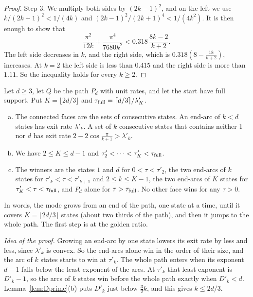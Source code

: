 \begin{proof}
Step 3. We multiply both sides by $(2k-1)^2$, and on the left we use
$k/(2k+1)^2<1/(4k)$ and $(2k-1)^2/(2k+1)^4<1/(4k^2)$. It is then enough to show
that
\[
 \frac{\pi^2}{12k}+\frac{\pi^4}{7680k^2}<0.318\,\frac{8k-2}{k+2}.
\]
The left side decreases in $k$, and the right side, which is
$0.318(8-\frac{18}{k+2})$, increases. At $k=2$ the left side is less than
$0.415$ and the right side is more than $1.11$. So the inequality holds for
every $k\ge2$.
\end{proof}

\begin{proposition}\label{prop:paths}
Let $d\ge3$, let $Q$ be the path $P_d$ with unit rates, and let the start have
full support. Put $K=\lfloor2d/3\rfloor$ and
$\tau_{\rm full}=\lceil d/3\rceil/\lambda'_K$.
\begin{enumerate}[(a)]
\item The connected faces are the sets of consecutive states. An end-arc of
$k<d$ states has exit rate $\lambda'_k$. A set of $k$ consecutive states that
contains neither $1$ nor $d$ has exit rate $2-2\cos\frac\pi{k+1}>\lambda'_k$.
\item We have $2\le K\le d-1$ and
$\tau'_2<\dots<\tau'_K<\tau_{\rm full}$.
\item The winners are the states $1$ and $d$ for $0<\tau<\tau'_2$, the two
end-arcs of $k$ states for $\tau'_k<\tau<\tau'_{k+1}$ and $2\le k\le K-1$, the
two end-arcs of $K$ states for $\tau'_K<\tau<\tau_{\rm full}$, and $P_d$ alone
for $\tau>\tau_{\rm full}$. No other face wins for any $\tau>0$.
\end{enumerate}
\end{proposition}

In words, the mode grows from an end of the path, one state at a time, until
it covers $K=\lfloor2d/3\rfloor$ states (about two thirds of the path), and then it jumps to the whole path. The
first step is at the golden ratio.

\emph{Idea of the proof.} Growing an end-arc by one state lowers its exit rate
by less and less, since $\lambda'_k$ is convex. So the end-arcs alone win in
the order of their size, and the arc of $k$ states starts to win at
$\tau'_k$. The whole path enters when its exponent $d-1$ falls below the least
exponent of the arcs. At $\tau'_k$ that least exponent is $D'_k-1$, so the
arcs of $k$ states win before the whole path exactly when $D'_k<d$.
Lemma~\ref{lem:Dprime}(b) puts $D'_k$ just below $\frac32k$, and this gives
$k\le2d/3$.

